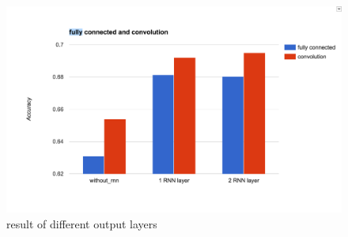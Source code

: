 \begin{figure}[H] 
	\centering
	\includegraphics[width=6in]{Figures/exp_fc_conv}
	\caption[result of different output layers]{result of different output layers}
	\label{fig:exp_fc_conv}
\end{figure}

